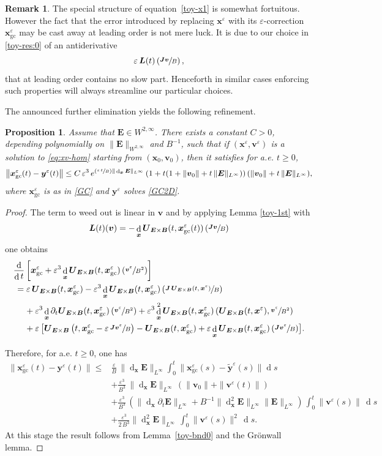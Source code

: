 \documentclass[10pt]{amsart}
\newcommand{\Psfrac}[2]{(\sfrac{#1}{#2})}
\let\eps\varepsilon
\let\d\partial
\DeclareMathOperator\dD{d}\let\dd\dD
\theoremstyle{plain}
\newtheorem{proposition}[theorem]{Proposition}
\theoremstyle{definition}
\newtheorem{remark}[theorem]{Remark}
\newcommand\br{\begin{remark}}
\newcommand\er{\end{remark}}
\newcommand{\bpr}{\begin{proposition}}
\newcommand{\epr}{\end{proposition}}
\newcommand\bB{{\boldsymbol B}}
\newcommand\bE{{\boldsymbol E}}
\newcommand\bJ{{\boldsymbol J}}
\newcommand\bL{{\boldsymbol L}}
\newcommand\bU{{\boldsymbol U}}
\newcommand\bfv{{\boldsymbol v}}
\newcommand\bfx{{\boldsymbol x}}
\newcommand\bfy{{\boldsymbol y}}
\newcommand\tby{\widetilde{\bfy}}
\newcommand{\GC}{\bfx_\mathrm{gc}}
\newcommand{\EcB}{\bU_{\bE\times\bB}}
\begin{document}
\br\label{antiderivative}
The special structure of equation~\eqref{toy-x1} is somewhat fortuitous. However the fact that the error introduced by replacing $\bfx^\eps$ with its $\eps$-correction $\GC^\eps$ may be cast away at leading order is not mere luck. It is due to our choice in \eqref{toy-res:0} of an antiderivative
\[
\eps\,\bL(t)\left(\sfrac{\bJ\bfv}{B}\right),
\]
that at leading order contains no slow part. Henceforth in similar cases enforcing such properties will always streamline our particular choices.
\er

The announced further elimination yields the following refinement.

\bpr
\label{toy-x}
Assume that $\bE\in W^{2,\infty}$. There exists
a constant $C>0$, depending polynomially on $\|\bE\|_{W^{2,\infty}}$ and
$B^{-1}$, such that if $(\bfx^\eps,\bfv^\eps)$ is a solution to
\eqref{eq:xv-hom} starting from $(\bfx_0,\bfv_0)$, then it satisfies for a.e. $t\geq0$,
\[
\bigl\|\GC^\eps(t)-\bfy^\eps(t)\bigr\|
\leq C\,\eps^3\,e^{\Psfrac{\eps\,t}{B}\|\dD_\bfx\bE\|_{L^\infty}}\,
(1+t(1+\|\bfv_0\|+t\,\|\bE\|_{L^\infty}))\,
(\|\bfv_0\|+t\,\|\bE\|_{L^\infty}),
\]
where $\GC^\eps$ is as in \eqref{GC} and $\bfy^\eps$ solves
\eqref{GC2D}.
\epr

\begin{proof}
The term to weed out is linear in $\bfv$ and by applying Lemma \ref{toy-1st} with
\[\bL(t)(\bfv)=-\dD_\bfx\EcB(t,\GC^\eps(t))\left(\sfrac{\bJ\bfv}{B}\right)
\]
one obtains
\begin{align*}
\frac{\dD}{\dD t}&\left[\GC^\eps+\eps^3\dD_\bfx\EcB(t,\GC^\eps)\left(\sfrac{\bfv^\eps}{B^2}\right)
\right]
\\
&\hspace*{-4mm}{}=\eps\,\EcB(t,\GC^\eps)
-\eps^3\dD_\bfx\EcB(t,\GC^\eps)\left(\sfrac{\bJ\,\EcB(t,\bfx^\eps)}{B}\right)\\
&{}+\eps^3\dD_\bfx\d_t\EcB(t,\GC^\eps)\left(\sfrac{\bfv^\eps}{B^2}\right)
+\eps^3\dD_\bfx^2\EcB(t,\GC^\eps)\left(\EcB(t,\bfx^\eps),\sfrac{\bfv^\eps}{B^2}\right)\\
&{}+\eps\,\bigl[\EcB\left(t,\GC^\eps-\eps\,\sfrac{\bJ\bfv^\eps}{B}\right)-\EcB(t,\GC^\eps)
+\eps\dD_\bfx\EcB(t,\GC^\eps)\left(\sfrac{\bJ\bfv^\eps}{B}\right)\bigr].
\end{align*}

Therefore, for a.e. $t\geq 0$, one has
\begin{align*}
\|\GC^\eps(t)-\bfy^\eps(t)\|
\leq{}& \frac{\eps}{B}\,\|{\dD_\bfx\bE}\|_{L^\infty}\int_0^t\|\GC^\eps(s)-\tby^\eps(s)\|\dD s \\
& +\frac{\eps^3}{B^3}\,\|{\dD_\bfx\bE}\|_{L^\infty}\,(\|\bfv_0\|+\|\bfv^\eps(t)\|)\\
&+\frac{\eps^3}{B^3}
\,(\|{\dD_\bfx\d_t\bE}\|_{L^\infty}+B^{-1}\|{\dD_\bfx^2\bE}\|_{L^\infty}\|\bE\|_{L^\infty})
\,\int_0^t\|\bfv^\eps(s)\|\,\dD s\\
&+\frac{\eps^3}{2\,B^3}\|{\dD_\bfx^2\bE}\|_{L^\infty}
\,\int_0^t\|\bfv^\eps(s)\|^2\,\dD s.
\end{align*}
At this stage the result follows from Lemma~\ref{toy-bnd0} and the Grönwall lemma.
\end{proof}
\end{document}
